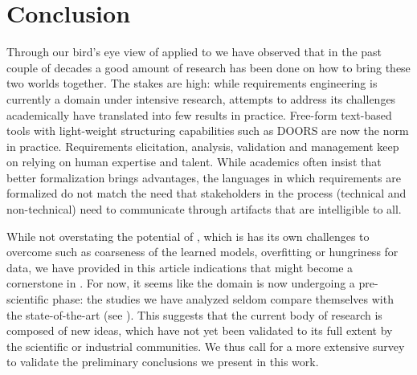 \section{Conclusion}

Through our bird's eye view of \ML applied to \RE we have observed that in the
past couple of decades a good amount of research has been done on how to bring
these two worlds together. The stakes are high: while requirements engineering
is currently a domain under intensive research, attempts to address its
challenges academically have translated into few results in practice. Free-form
text-based tools with light-weight structuring capabilities such as DOORS are
now the norm in practice. Requirements elicitation, analysis, validation and
management keep on relying on human expertise and talent. While academics often insist that
better formalization brings advantages, the languages in which requirements are
formalized do not match the need that stakeholders in the \RE process
(technical and non-technical) need to communicate through artifacts that are
intelligible to all.

While not overstating the potential of \ML, which is has its own challenges to
overcome such as coarseness of the learned models, overfitting or hungriness
for data, we have provided in this article indications that \ML might become a cornerstone in \RE. For now, it
seems like the domain is now undergoing a pre-scientific phase: the studies we
have analyzed seldom compare themselves with the state-of-the-art (see
). This suggests that the current body of research is composed of
new ideas, which have not yet been validated to its full extent by the
scientific or industrial communities. We thus call for a more extensive survey to validate
the preliminary conclusions we present in this work.
